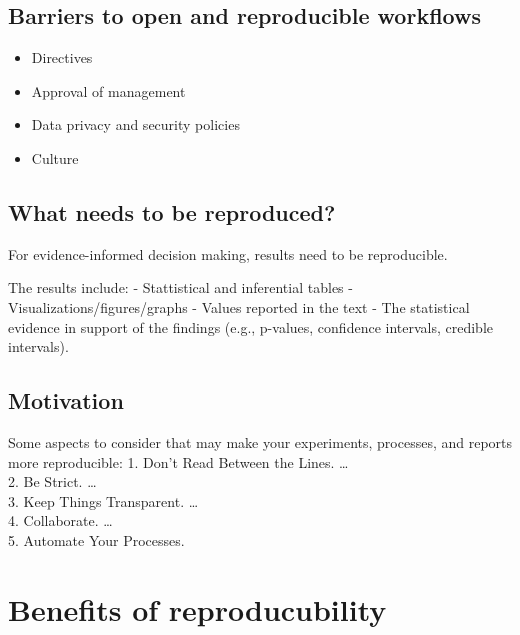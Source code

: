 \documentclass[
  12pt,
]{book}
\providecommand{\tightlist}{%
  \setlength{\itemsep}{0pt}\setlength{\parskip}{0pt}}
\begin{document}
\hypertarget{barriers-to-open-and-reproducible-workflows}{%
\subsection{Barriers to open and reproducible workflows}\label{barriers-to-open-and-reproducible-workflows}}

\begin{itemize}
\tightlist
\item
  Directives\\
\item
  Approval of management\\
\item
  Data privacy and security policies\\
\item
  Culture
\end{itemize}

\hypertarget{what-needs-to-be-reproduced}{%
\subsection{What needs to be reproduced?}\label{what-needs-to-be-reproduced}}

For evidence-informed decision making, results need to be reproducible.

The results include:
- Stattistical and inferential tables
- Visualizations/figures/graphs
- Values reported in the text
- The statistical evidence in support of the findings (e.g., p-values, confidence intervals, credible intervals).

\hypertarget{motivation}{%
\subsection{Motivation}\label{motivation}}

Some aspects to consider that may make your experiments, processes, and reports more reproducible:
1. Don't Read Between the Lines. \ldots{}\\
2. Be Strict. \ldots{}\\
3. Keep Things Transparent. \ldots{}\\
4. Collaborate. \ldots{}\\
5. Automate Your Processes.

\hypertarget{benefits-of-reproducubility}{%
\section{Benefits of reproducubility}\label{benefits-of-reproducubility}}
\end{document}
